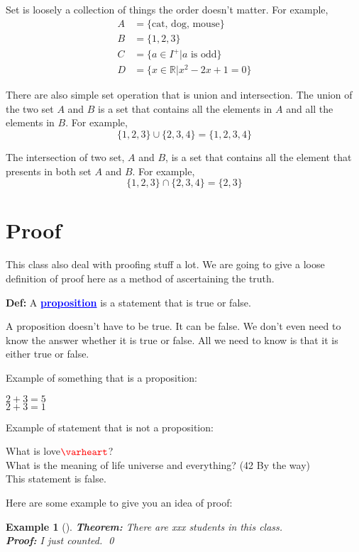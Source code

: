\documentclass[a4paper, 12pt]{article}
\newcommand{\real}{\mathbb{R}}
\renewcommand{\heartsuit}{\textcolor{red}{\varheart}}
\newcommand{\definition}{\textbf{Def:} }
\newcommand{\theorem}{\textbf{Theorem:} }
\renewcommand{\proof}{\textbf{Proof:} }
\newcommand{\kwd}[1]{\textcolor{blue}{\textbf{\underline{#1}}}}
\theoremstyle{examplestyle}
\newtheorem{examplethm}{Example}
\newenvironment{example}[1][]{\begin{mdframed}[style=example]\begin{examplethm}[#1]}{\end{examplethm}\end{mdframed}}
\begin{document}
\begin{multicols}{2}
Set is loosely a collection of things the order doesn't matter. For example,
\begin{align}
	A &= \{\text{cat, dog, mouse}\}\\
	B &= \{1, 2, 3\}\\
	C &= \{a \in I^+ |a \text{ is odd} \}\\
	D &= \{x \in \real | x^2 - 2x + 1 = 0 \}	
\end{align}

There are also simple set operation that is union and intersection. The union of the two set $A$ and $B$ is a set that contains all the elements in $A$ and all the elements in $B$. For example,
\[
	\{1,2,3\} \cup \{2,3,4\} = \{1,2,3,4\}
\]

The intersection of two set, $A$ and $B$, is a set that contains all the element that presents in both set $A$ and $B$. For example,
\[
	\{1,2,3\} \cap \{2,3,4\} = \{2,3\}
\]

\section*{Proof}

This class also deal with proofing stuff a lot. We are going to give a loose definition of proof here as a method of ascertaining the truth.

\definition A \kwd{proposition} is a statement that is true or false.

A proposition doesn't have to be true. It can be false. We don't even need to know the answer whether it is true or false. All we need to know is that it is either true or false.

Example of something that is a proposition:
\begin{center}
	$2+3=5$\\
	$2+3=1$
\end{center}

Example of statement that is not a proposition:
\begin{center}
	What is love$\heartsuit$?\\
	\vspace{0.5em}
	What is the meaning of life universe and everything? (42 By the way)\\
	\vspace{0.5em}
	This statement is false.
\end{center}

Here are some example to give you an idea of proof:
\begin{example}
	\theorem There are xxx students in this class.\\
	\proof I just counted. \qed
\end{example}


\end{multicols}
\end{document}
